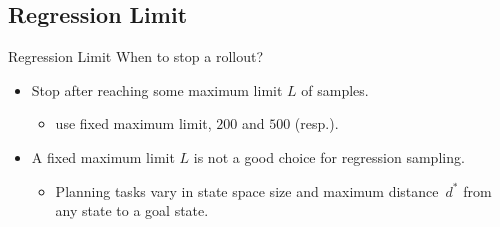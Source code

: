 \documentclass[10pt]{beamer}
\providecommand{\ssdiameter}{\ensuremath{d^*}\xspace}
\begin{document}
\subsection{Regression Limit}

\begin{frame}{Regression Limit}
\large When to stop a rollout?
\normalsize

\begin{itemize}
    \item Stop after reaching some maximum limit $L$ of samples.
    \begin{itemize}
        \item \citet{yu2020learning, otoole2022sampling} use fixed maximum limit, $200$ and $500$ (resp.).
    \end{itemize}
    \bigskip
    \item A fixed maximum limit $L$ is not a good choice for regression sampling.
    \begin{itemize}
        \item Planning tasks vary in state space size and maximum distance~\ssdiameter from any state to a goal state.
    \end{itemize}
\end{itemize}
\end{frame}
\end{document}
